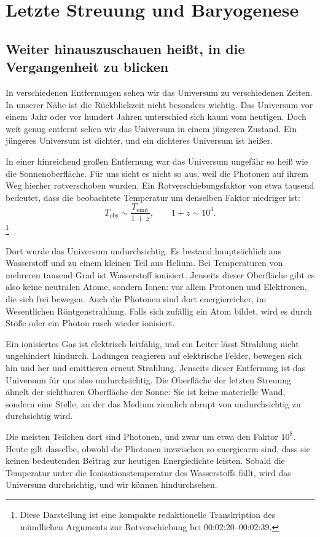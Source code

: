 \chapter{Letzte Streuung und Baryogenese}

\section{Weiter hinauszuschauen heißt, in die Vergangenheit zu blicken}

In verschiedenen Entfernungen sehen wir das Universum zu verschiedenen Zeiten. In unserer Nähe ist die Rückblickzeit nicht besonders wichtig. Das Universum vor einem Jahr oder vor hundert Jahren unterschied sich kaum vom heutigen. Doch weit genug entfernt sehen wir das Universum in einem jüngeren Zustand. Ein jüngeres Universum ist dichter, und ein dichteres Universum ist heißer.

In einer hinreichend großen Entfernung war das Universum ungefähr so heiß wie die Sonnenoberfläche. Für uns sieht es nicht so aus, weil die Photonen auf ihrem Weg hierher rotverschoben wurden. Ein Rotverschiebungsfaktor von etwa tausend bedeutet, dass die beobachtete Temperatur um denselben Faktor niedriger ist:
\[
T_{\mathrm{obs}} \sim \frac{T_{\mathrm{emit}}}{1+z},
\qquad
1+z \sim 10^3.
\]\footnote{Diese Darstellung ist eine kompakte redaktionelle Transkription des mündlichen Arguments zur Rotverschiebung bei 00:02:20--00:02:39.}

Dort wurde das Universum undurchsichtig. Es bestand hauptsächlich aus Wasserstoff und zu einem kleinen Teil aus Helium. Bei Temperaturen von mehreren tausend Grad ist Wasserstoff ionisiert. Jenseits dieser Oberfläche gibt es also keine neutralen Atome, sondern Ionen: vor allem Protonen und Elektronen, die sich frei bewegen. Auch die Photonen sind dort energiereicher, im Wesentlichen Röntgenstrahlung. Falls sich zufällig ein Atom bildet, wird es durch Stöße oder ein Photon rasch wieder ionisiert.

Ein ionisiertes Gas ist elektrisch leitfähig, und ein Leiter lässt Strahlung nicht ungehindert hindurch. Ladungen reagieren auf elektrische Felder, bewegen sich hin und her und emittieren erneut Strahlung. Jenseits dieser Entfernung ist das Universum für uns also undurchsichtig. Die Oberfläche der letzten Streuung ähnelt der sichtbaren Oberfläche der Sonne: Sie ist keine materielle Wand, sondern eine Stelle, an der das Medium ziemlich abrupt von undurchsichtig zu durchsichtig wird.

Die meisten Teilchen dort sind Photonen, und zwar um etwa den Faktor \(10^8\). Heute gilt dasselbe, obwohl die Photonen inzwischen so energiearm sind, dass sie keinen bedeutenden Beitrag zur heutigen Energiedichte leisten. Sobald die Temperatur unter die Ionisationstemperatur des Wasserstoffs fällt, wird das Universum durchsichtig, und wir können hindurchsehen.

